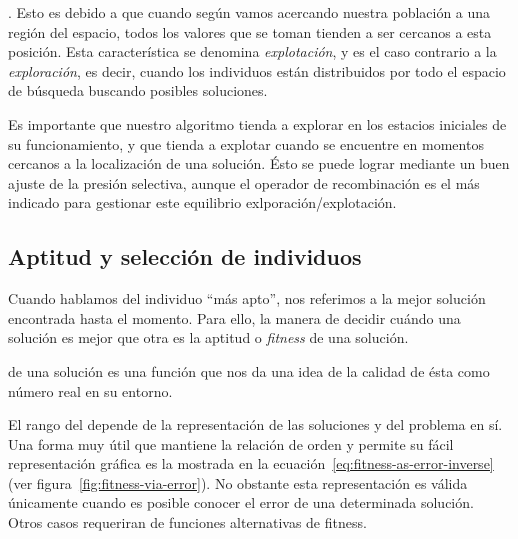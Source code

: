 . Esto es debido a que cuando según vamos acercando nuestra población a una región del espacio, todos los valores que se toman tienden a ser cercanos a esta posición. Esta característica se denomina \textit{explotación}, y es el caso contrario a la \textit{exploración}, es decir, cuando los individuos están distribuidos por todo el espacio de búsqueda buscando posibles soluciones.

Es importante que nuestro algoritmo tienda a explorar en los estacios iniciales de su funcionamiento, y que tienda a explotar cuando se encuentre en momentos cercanos a la localización de una solución. Ésto se puede lograr mediante un buen ajuste de la presión selectiva, aunque el operador de recombinación es el más indicado para gestionar este equilibrio exlporación/explotación.

\subsection{Aptitud y selección de individuos}

Cuando hablamos del individuo \enquote{más apto}, nos referimos a la mejor solución encontrada hasta el momento. Para ello, la manera de decidir cuándo una solución es mejor que otra es la aptitud o \textit{fitness} de una solución.

 de una solución es una función que nos da una idea de la calidad de ésta como número real en su entorno.

El rango del  depende de la representación de las soluciones y del problema en sí. Una forma muy útil que mantiene la relación de orden y permite su fácil representación gráfica es la mostrada en la ecuación~\ref{eq:fitness-as-error-inverse} (ver figura~\ref{fig:fitness-via-error}). No obstante esta representación es válida únicamente cuando es posible conocer el error de una determinada solución. Otros casos requeriran de funciones alternativas de fitness.

